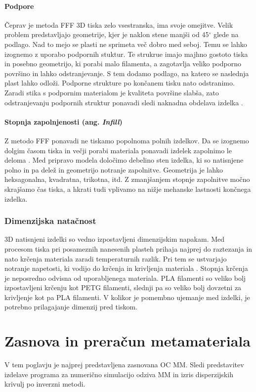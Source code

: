 \documentclass[12pt]{report}
\begin{document}
\subsubsection{Podpore}
Čeprav je metoda \ac{FFF} 3D tiska zelo vsestranska, ima svoje omejitve. Velik problem predstavljajo geometrije, kjer je naklon stene manjši od 45$^{\circ}$ glede na podlago. Nad to mejo se plasti ne sprimeta več dobro med seboj. Temu se lahko izognemo z uporabo podpornih stuktur. Te strukrue imajo majhno gostoto tiska in posebno geometrijo, ki porabi malo filamenta, a zagotavlja veliko podporno površino in lahko odstranjevanje. 
S tem dodamo podlago, na katero se naslednja plast lahko odloži. Podporne strukture po končanem tisku nato odstranimo. Zaradi stika s podpornim materialom je kvaliteta površine slabša, zato
odstranjevanju podpornih struktur ponavadi sledi naknadna obdelava izdelka \cite{redwood20173d}.

\subsubsection{Stopnja zapolnjenosti (ang. \emph{Infill})}
Z metodo \ac{FFF} ponavadi ne tiskamo popolnoma polnih izdelkov. Da se izognemo dolgim časom tiska in večji porabi materiala ponavadi izdelek zapolnimo le deloma \cite{redwood20173d}.
Med pripravo modela določimo debelino sten izdelka, ki so natisnjene polno in pa delež in geometrijo notranje zapolnitve. Geometrija je lahko heksagonalna, kvadratna, trikotna, itd. Z zmanjšanjem stopnje
zapolnitve močno skrajšamo čas tiska, a hkrati tudi vplivamo na nižje mehanske lastnosti končnega izdelka.

\subsection{Dimenzijska natačnost}
3D natisnjeni izdelki so vedno izpostavljeni dimenzijskim napakam. Med procesom tiska pri posameznih nanesenih plasteh prihaja najprej do raztezanja in nato krčenja materiala zaradi temperaturnih
razlik. Pri tem se ustvarjajo notranje napetosti, ki vodijo do krčenja in krivljenja materiala \cite{redwood20173d}. Stopnja krčenja je neposredno odvisna od uporabljenega materiala. PLA filamenti so veliko bolj izpostavljeni krčenju kot PETG filamenti, slednji pa 
so veliko bolj dovzetni za krivljenje kot pa PLA filamenti. V kolikor je pomembno ujemanje med izdelki, je potrebno prilagajanje dimenzij pred tiskom. 

\chapter{Zasnova in preračun metamateriala}
V tem poglavju je najprej predstavljena zasnovana \ac{OC} \ac{MM}. Sledi predstavitev izdelave programa za numerično simulacijo odziva \ac{MM} in izris disperzijskih krivulj po inverzni
metodi.
\end{document}
